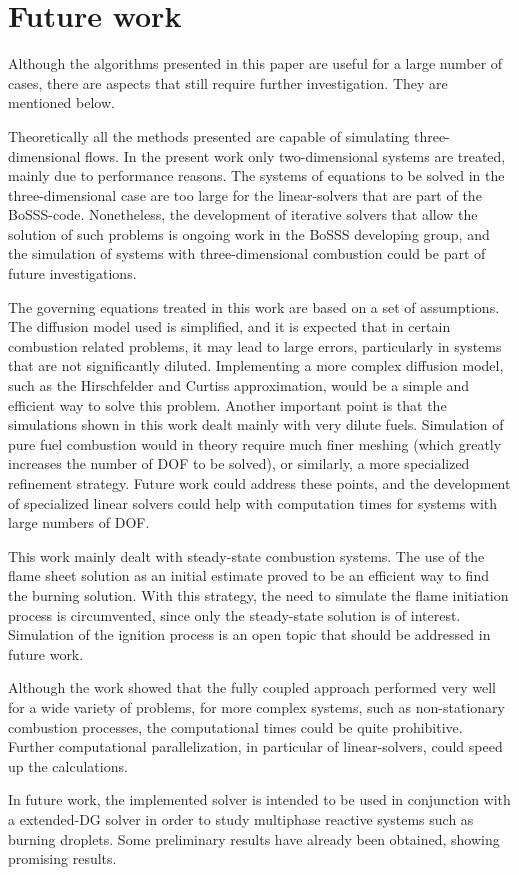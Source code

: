 \section{Future work}

Although the algorithms presented in this paper are useful for a large number of cases, there are aspects that still require further investigation. They are mentioned below.

Theoretically all the methods presented are capable of simulating three-dimensional flows. In the present work only two-dimensional systems are treated, mainly due to performance reasons. The systems of equations to be solved in the three-dimensional case are too large for the linear-solvers that are part of the BoSSS-code. Nonetheless, the development of iterative solvers that allow the solution of such problems is ongoing work in the BoSSS developing group, and the simulation of systems with three-dimensional combustion could be part of future investigations.

The governing equations treated in this work are based on a set of assumptions.
The diffusion model used is simplified, and it is expected that in certain combustion related problems, it may lead to large errors, particularly in systems that are not significantly diluted. Implementing a more complex diffusion model, such as the Hirschfelder and Curtiss approximation, would be a simple and efficient way to solve this problem. 
Another important point is that the simulations shown in this work dealt mainly with very dilute fuels. Simulation of pure fuel combustion would in theory require much finer meshing (which greatly increases the number of DOF to be solved), or similarly, a more specialized refinement strategy. Future work could address these points, and the development of specialized linear solvers could help with computation times for systems with large numbers of DOF.

This work mainly dealt with steady-state combustion systems. The use of the flame sheet solution as an initial estimate proved to be an efficient way to find the burning solution. With this strategy, the need to simulate the flame initiation process is circumvented, since only the steady-state solution is of interest.  Simulation of the ignition process is an open topic that should be addressed in future work. 

Although the work showed that the fully coupled approach performed very well for a wide variety of problems, for more complex systems, such as non-stationary combustion processes, the computational times could be quite prohibitive. Further computational parallelization, in particular of linear-solvers, could speed up the calculations. 

In future work, the implemented solver is intended to be used in conjunction with a extended-DG solver \parencite{kummerExtendedDiscontinuousGalerkin2017,kummerBoSSSPackageMultigrid2021,krauseIncompressibleImmersedBoundary2017} in order to study multiphase reactive systems such as burning droplets. Some preliminary results have already been obtained, showing promising results. %

